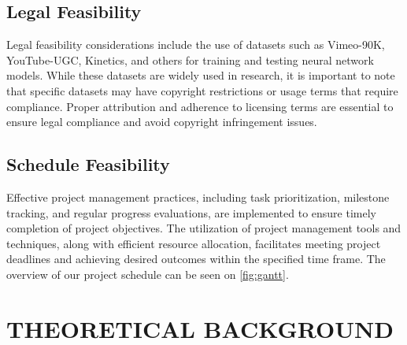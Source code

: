 \documentclass{ioereport}
\begin{document}
    \subsection{Legal Feasibility}
    Legal feasibility considerations include the use of datasets such as Vimeo-90K, YouTube-UGC, Kinetics, and others for training and testing neural network models. While these datasets are widely used in research, it is important to note that specific datasets may have copyright restrictions or usage terms that require compliance. Proper attribution and adherence to licensing terms are essential to ensure legal compliance and avoid copyright infringement issues.
    \subsection{Schedule Feasibility}
    Effective project management practices, including task prioritization, milestone tracking, and regular progress evaluations, are implemented to ensure timely completion of project objectives. The utilization of project management tools and techniques, along with efficient resource allocation, facilitates meeting project deadlines and achieving desired outcomes within the specified time frame. The overview of our project schedule can be seen on \autoref{fig:gantt}.
\pagebreak


\section{\MakeUppercase{Theoretical Background}}
\end{document}
